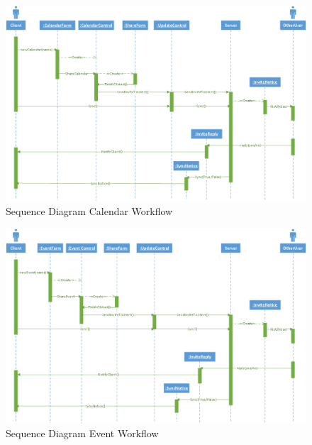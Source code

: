 \begin{figure}[ht!]
\centering
\includegraphics[width=160mm]{Figures/SequenceDiagramCalendarWorkflow.png}
\caption{Sequence Diagram Calendar Workflow  \label{overflow}}
\end{figure}

\newpage
\begin{figure}[ht!]
\centering
\includegraphics[width=160mm]{Figures/SequenceDiagramEventWorkflow.png}
\caption{Sequence Diagram Event Workflow  \label{overflow}}
\end{figure} 
